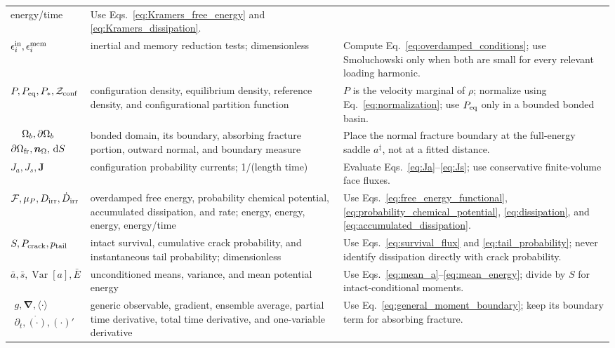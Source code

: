 \begin{longtable}{>{\raggedright\arraybackslash}p{}
                  >{\raggedright\arraybackslash}p{}
                  >{\raggedright\arraybackslash}p{}}
energy/time & Use Eqs.~\eqref{eq:Kramers_free_energy} and \eqref{eq:Kramers_dissipation}.\\
$\epsilon_i^{\rm in},\epsilon_i^{\rm mem}$ & inertial and memory reduction tests; dimensionless &
Compute Eq.~\eqref{eq:overdamped_conditions}; use Smoluchowski only when both are small for every
relevant loading harmonic.\\
$P,P_{\rm eq},P_*,\mathcal Z_{\rm conf}$ & configuration density, equilibrium density, reference
density, and configurational partition function & $P$ is the velocity marginal of $\rho$; normalize
using Eq.~\eqref{eq:normalization}; use $P_{\rm eq}$ only in a bounded bonded basin.\\
$\begin{gathered}\Omega_b,\partial\Omega_b\\\partial\Omega_{\rm fr},\bm n_\Omega,\,\mathrm d S\end{gathered}$ & bonded domain, its
boundary, absorbing fracture portion, outward normal, and boundary measure & Place the normal
fracture boundary at the full-energy saddle $a^\ddagger$, not at a fitted distance.\\
$J_a,J_s,\bm J$ & configuration probability currents; 1/(length time) & Evaluate
Eqs.~\eqref{eq:Ja}--\eqref{eq:Js}; use conservative finite-volume face fluxes.\\
$\mathcal F,\mu_P,D_{\rm irr},\dot D_{\rm irr}$ & overdamped free energy, probability chemical
potential, accumulated dissipation, and rate; energy, energy, energy, energy/time & Use
Eqs.~\eqref{eq:free_energy_functional}, \eqref{eq:probability_chemical_potential},
\eqref{eq:dissipation}, and \eqref{eq:accumulated_dissipation}.\\
$S,P_{\rm crack},p_{\rm tail}$ & intact survival, cumulative crack probability, and instantaneous
tail probability; dimensionless & Use Eqs.~\eqref{eq:survival_flux} and
\eqref{eq:tail_probability}; never identify dissipation directly with crack probability.\\
$\bar a,\bar s,\operatorname{Var}[a],\bar E$ & unconditioned means, variance, and mean potential
energy & Use Eqs.~\eqref{eq:mean_a}--\eqref{eq:mean_energy}; divide by $S$ for intact-conditional
moments.\\
$\begin{gathered}g,\bm\nabla,\langle\cdot\rangle\\\partial_t,\dot{(\cdot)},(\cdot)'\end{gathered}$ & generic observable, gradient,
ensemble average, partial time derivative, total time derivative, and one-variable derivative &
Use Eq.~\eqref{eq:general_moment_boundary}; keep its boundary term for absorbing fracture.\\
\end{longtable}

